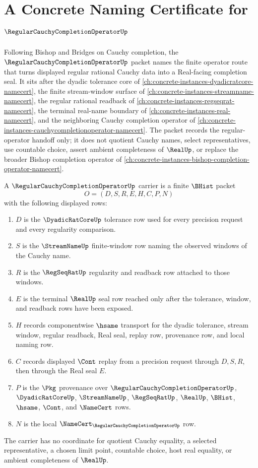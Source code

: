 \chapter{A Concrete Naming Certificate for $\RegularCauchyCompletionOperatorUp$}
\label{ch:concrete-instances-regular-cauchy-completion-operator-namecert}

Following Bishop and Bridges on Cauchy completion, the $\RegularCauchyCompletionOperatorUp$ packet names the finite operator route that turns displayed regular rational Cauchy data into a Real-facing completion seal. It sits after the dyadic tolerance core of \autoref{ch:concrete-instances-dyadicratcore-namecert}, the finite stream-window surface of \autoref{ch:concrete-instances-streamname-namecert}, the regular rational readback of \autoref{ch:concrete-instances-regseqrat-namecert}, the terminal real-name boundary of \autoref{ch:concrete-instances-real-namecert}, and the neighboring Cauchy completion operator of \autoref{ch:concrete-instances-cauchycompletionoperator-namecert}. The packet records the regular-operator handoff only; it does not quotient Cauchy names, select representatives, use countable choice, assert ambient completeness of $\RealUp$, or replace the broader Bishop completion operator of \autoref{ch:concrete-instances-bishop-completion-operator-namecert}.

\begin{definition}
\label{def:regular-cauchy-completion-operator-carrier}
A $\RegularCauchyCompletionOperatorUp$ carrier is a finite $\BHist$ packet
$$
O=(D,S,R,E,H,C,P,N)
$$
with the following displayed rows:
\begin{enumerate}
\item $D$ is the $\DyadicRatCoreUp$ tolerance row used for every precision request and every regularity comparison.
\item $S$ is the $\StreamNameUp$ finite-window row naming the observed windows of the Cauchy name.
\item $R$ is the $\RegSeqRatUp$ regularity and readback row attached to those windows.
\item $E$ is the terminal $\RealUp$ seal row reached only after the tolerance, window, and readback rows have been exposed.
\item $H$ records componentwise $\hsame$ transport for the dyadic tolerance, stream window, regular readback, Real seal, replay row, provenance row, and local naming row.
\item $C$ records displayed $\Cont$ replay from a precision request through $D,S,R$, then through the Real seal $E$.
\item $P$ is the $\Pkg$ provenance over $\RegularCauchyCompletionOperatorUp$, $\DyadicRatCoreUp$, $\StreamNameUp$, $\RegSeqRatUp$, $\RealUp$, $\BHist$, $\hsame$, $\Cont$, and $\NameCert$ rows.
\item $N$ is the local $\NameCert_{\RegularCauchyCompletionOperatorUp}$ row.
\end{enumerate}
The carrier has no coordinate for quotient Cauchy equality, a selected representative, a chosen limit point, countable choice, host real equality, or ambient completeness of $\RealUp$.
\end{definition}

